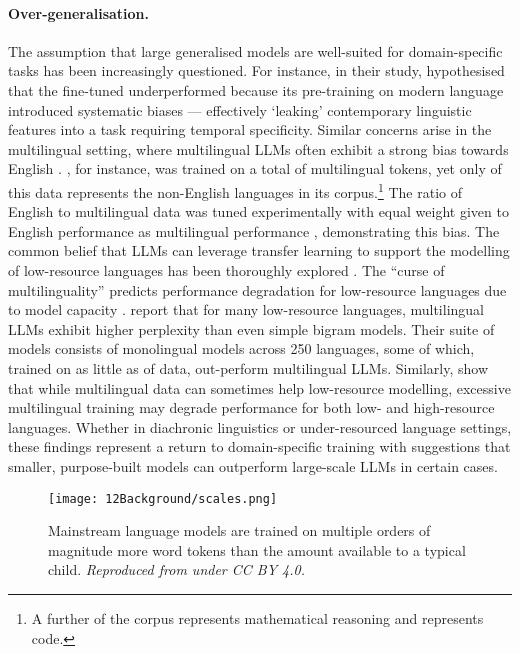 \paragraph{Over-generalisation.} The assumption that large generalised models are well-suited for domain-specific tasks has been increasingly questioned. For instance, in their study, \citet{fittschen2025pretraininglanguagemodelsdiachronic} hypothesised that the fine-tuned \llamathree underperformed because its pre-training on modern language introduced systematic biases --- effectively `leaking' contemporary linguistic features into a task requiring temporal specificity. Similar concerns arise in the multilingual setting, where multilingual LLMs often exhibit a strong bias towards English \citep{wendler-etal-2024-llamas}. \llamathree, for instance, was trained on a total of  multilingual tokens, yet only  of this data represents the  non-English languages in its corpus.\footnote{A further  of the corpus represents mathematical reasoning and  represents code.} The ratio of English to multilingual data was tuned experimentally with equal weight given to English performance as multilingual performance \citep{grattafiori2024llama}, demonstrating this bias. The common belief that LLMs can leverage transfer learning to support the modelling of low-resource languages has been thoroughly explored \citep{wu-dredze-2019-beto}. The ``curse of multilinguality'' predicts performance degradation for low-resource languages due to model capacity \citep{conneau2020unsupervised}. \citet{chang2024goldfish} report that for many low-resource languages, multilingual LLMs exhibit higher perplexity than even simple bigram models. Their  suite of models consists of monolingual models across 250 languages, some of which, trained on as little as  of data, out-perform multilingual LLMs. Similarly, \citet{chang2024multilinguality} show that while multilingual data can sometimes help low-resource modelling, excessive multilingual training may degrade performance for both low- and high-resource languages. Whether in diachronic linguistics or under-resourced language settings, these findings represent a return to domain-specific training with suggestions that smaller, purpose-built models can outperform large-scale LLMs in certain cases.

\begin{figure}
    \centering
    \texttt{[image: 12Background/scales.png]}
    \caption{Mainstream language models are trained on multiple orders of magnitude more word tokens than the amount available to a typical child. \emph{Reproduced from \citet{wilcox2025bigger} under CC BY 4.0.}}
    \label{fig:12-scales}
\end{figure}

